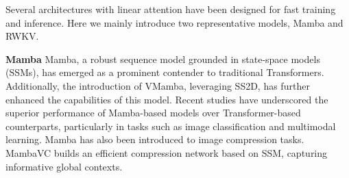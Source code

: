 Several architectures with linear attention have been designed for fast training and inference. Here we mainly introduce two representative models, Mamba and RWKV. 

\noindent\textbf{Mamba}
Mamba\cite{Gu2023MambaLS, Zhu2024VisionME}, a robust sequence model grounded in state-space models (SSMs), has emerged as a prominent contender to traditional Transformers. Additionally, the introduction of VMamba\cite{Liu2024VMambaVS}, leveraging SS2D, has further enhanced the capabilities of this model. Recent studies have underscored the superior performance of Mamba-based models over Transformer-based counterparts\cite{Guo2024MambaIRAS, Ji2024DeformMambaNF}, particularly in tasks such as image classification and multimodal learning\cite{Chen2024VideoMS, Qiao2024VLMambaES, Ma2024UMambaEL}. 
Mamba has also been introduced to image compression tasks. MambaVC\cite{Qin2024MambaVCLV} builds an efficient compression network based on SSM, capturing informative global contexts.













